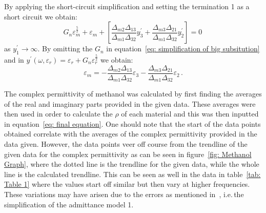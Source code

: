 \documentclass[12pt, a4paper]{article}
\begin{document}
By applying the short-circuit simplification and setting the termination 1 as a short circuit we obtain:
\begin{equation}
    G_n \varepsilon_m^{\frac{5}{2}} + \varepsilon_m + \left[\frac{\Delta_{m2}\Delta_{13}}{\Delta_{m1}\Delta_{32}} y^{\prime}_3 + \frac{\Delta_{m3}\Delta_{21}}{\Delta_{m1}\Delta_{32}} y^{\prime}_2\right] = 0 \, \label{eq: simplification of big subsitution}
\end{equation}
as \(y^{\prime}_1 \rightarrow \infty\). By omitting the \(G_n\) in equation~\ref{eq: simplification of big subsitution} and in \(y^{\prime}(\omega, \varepsilon_r) = \varepsilon_r + G_n \varepsilon_r^{\frac{5}{2}}\) we obtain:
\begin{equation}
    \varepsilon_m = - \frac{\Delta_{m2}\Delta_{13}}{\Delta_{m1}\Delta_{32}} \varepsilon_3 - \frac{\Delta_{m3}\Delta_{21}}{\Delta_{m1}\Delta_{32}} \varepsilon_2 \,. \label{eq: final equation}
\end{equation}

The complex permittivity of methanol was calculated by first finding the averages of the real and imaginary parts provided in the given data. These averages were then used in order to calculate the \(\rho\) of each material and this was then inputted in equation~\ref{eq: final equation}. One should note that the start of the data points obtained correlate with the averages of the complex permittivity provided in the data given. However, the data points veer off course from the trendline of the given data for the complex permittivity as can be seen in figure~\ref{fig: Methanol Graph}, where the dotted line is the trendline for the given data, while the whole line is the calculated trendline. This can be seen as well in the data in table~\ref{tab: Table 1} where the values start off similar but then vary at higher frequencies. These variations may have arisen due to the errors as mentioned in~\cite{marsland1987dielectric}, i.e.\,the simplification of the admittance model 1. 
\end{document}
